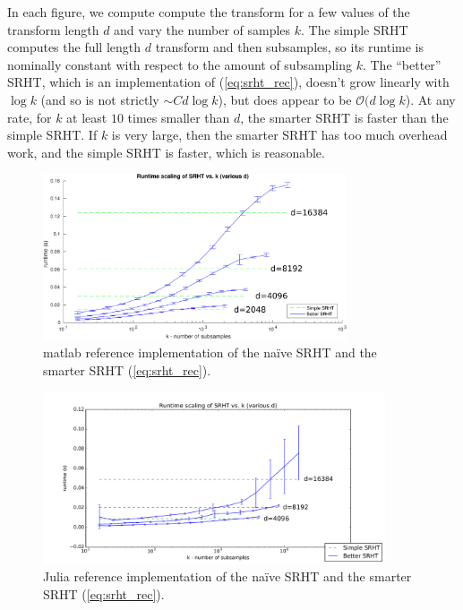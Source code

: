 \documentclass[12pt]{article}
\begin{document}
In each figure, we compute compute the transform for a few values of the transform length $d$ and vary the number of samples $k$.  The simple SRHT computes the full length $d$ transform and then subsamples, so its runtime is nominally constant with respect to the amount of subsampling $k$.  The ``better'' SRHT, which is an implementation of (\ref{eq:srht_rec}), doesn't grow linearly with $\log k$ (and so is not strictly $\sim C d\log k$), but does appear to be $\mathcal{O}(d\log k$).  At any rate, for $k$ at least $10$ times smaller than $d$, the smarter SRHT is faster than the simple SRHT.  If $k$ is very large, then the smarter SRHT has too much overhead work, and the simple SRHT is faster, which is reasonable.


\begin{figure}[ht!]
   \centering
   \includegraphics[width=0.8\textwidth]{figures/srht_matlab_ref_k_scaling_trim.pdf}
   \caption{{\sc matlab} reference implementation of the na\"ive SRHT and the smarter SRHT (\ref{eq:srht_rec}).}
   \label{fig:srht_matlab_ref}
\end{figure}

\begin{figure}[ht!]
   \centering
   \includegraphics[width=0.9\textwidth]{figures/srht_julia_ref_k_scaling.pdf}
   \caption{Julia reference implementation of the na\"ive SRHT and the smarter SRHT (\ref{eq:srht_rec}).}
   \label{fig:srht_julia_ref}
\end{figure}
\end{document}
